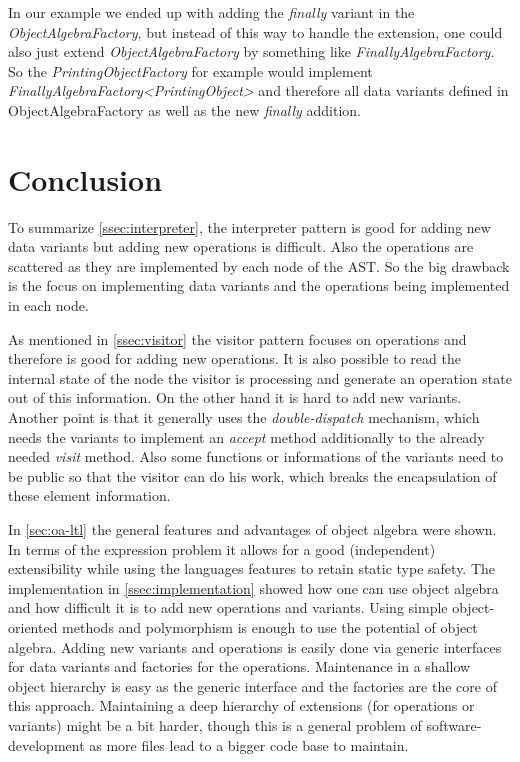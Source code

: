 \documentclass{llncs}
\begin{document}
In our example we ended up with adding the \emph{finally} variant in the \emph{ObjectAlgebraFactory}, but instead of this way to handle the extension, one could also just extend \emph{ObjectAlgebraFactory} by something like \emph{FinallyAlgebraFactory}. So the \emph{PrintingObjectFactory} for example would implement \emph{FinallyAlgebraFactory\textless PrintingObject\textgreater} and therefore all data variants defined in ObjectAlgebraFactory as well as the new \emph{finally} addition.


\section{Conclusion} \label{sec:conclusion}
To summarize \autoref{ssec:interpreter}, the interpreter pattern is good for adding new data variants but adding new operations is difficult. Also the operations are scattered as they are implemented by each node of the AST. So the big drawback is the focus on implementing data variants and the operations being implemented in each node.

As mentioned in \autoref{ssec:visitor} the visitor pattern focuses on operations and therefore is good for adding new operations. It is also possible to read the internal state of the node the visitor is processing and generate an operation state out of this information. On the other hand it is hard to add new variants. Another point is that it generally uses the \emph{double-dispatch} mechanism, which needs the variants to implement an \emph{accept} method additionally to the already needed \emph{visit} method. Also some functions or informations of the variants need to be public so that the visitor can do his work, which breaks the encapsulation of these element information.

In \autoref{sec:oa-ltl} the general features and advantages of object algebra were shown. In terms of the expression problem it allows for a good (independent) extensibility while using the languages features to retain static type safety. The implementation in \autoref{ssec:implementation} showed how one can use object algebra and how difficult it is to add new operations and variants. Using simple object-oriented methods and polymorphism is enough to use the potential of object algebra. Adding new variants and operations is easily done via generic interfaces for data variants and factories for the operations. Maintenance in a shallow object hierarchy is easy as the generic interface and the factories are the core of this approach. Maintaining a deep hierarchy of extensions (for operations or variants) might be a bit harder, though this is a general problem of software-development as more files lead to a bigger code base to maintain. 
\end{document}
